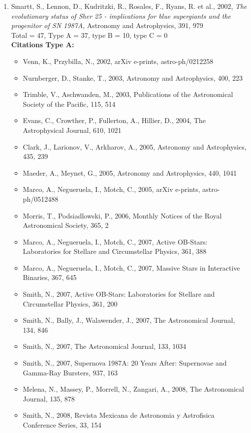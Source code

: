 \documentclass{letter}
\begin{document}
\begin{enumerate}
\item Smartt, S., Lennon, D., Kudritzki, R., Rosales, F., Ryans, R. et al., 2002, {\it The evolutionary status of Sher 25 - implications for blue supergiants and the progenitor of SN 1987A}, Astronomy and Astrophysics, 391, 979 \\ 
Total = 47, Type A = 37, type B = 10, type C = 0 \\ 
{\bf Citations Type A:}
\begin{itemize}
\item Venn, K., Przybilla, N., 2002, arXiv e-prints, astro-ph/0212258
\item Nurnberger, D., Stanke, T., 2003, Astronomy and Astrophysics, 400, 223
\item Trimble, V., Aschwanden, M., 2003, Publications of the Astronomical Society of the Pacific, 115, 514
\item Evans, C., Crowther, P., Fullerton, A., Hillier, D., 2004, The Astrophysical Journal, 610, 1021
\item Clark, J., Larionov, V., Arkharov, A., 2005, Astronomy and Astrophysics, 435, 239
\item Maeder, A., Meynet, G., 2005, Astronomy and Astrophysics, 440, 1041
\item Marco, A., Negueruela, I., Motch, C., 2005, arXiv e-prints, astro-ph/0512488
\item Morris, T., Podsiadlowski, P., 2006, Monthly Notices of the Royal Astronomical Society, 365, 2
\item Marco, A., Negueruela, I., Motch, C., 2007, Active OB-Stars: Laboratories for Stellare and Circumstellar Physics, 361, 388
\item Marco, A., Negueruela, I., Motch, C., 2007, Massive Stars in Interactive Binaries, 367, 645
\item Smith, N., 2007, Active OB-Stars: Laboratories for Stellare and Circumstellar Physics, 361, 200
\item Smith, N., Bally, J., Walawender, J., 2007, The Astronomical Journal, 134, 846
\item Smith, N., 2007, The Astronomical Journal, 133, 1034
\item Smith, N., 2007, Supernova 1987A: 20 Years After: Supernovae and Gamma-Ray Bursters, 937, 163
\item Melena, N., Massey, P., Morrell, N., Zangari, A., 2008, The Astronomical Journal, 135, 878
\item Smith, N., 2008, Revista Mexicana de Astronomia y Astrofisica Conference Series, 33, 154

\end{itemize}
\end{enumerate}
\end{document}
